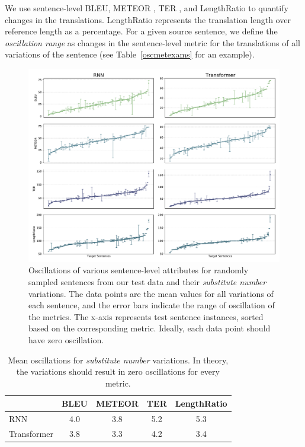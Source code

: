 We use sentence-level BLEU, METEOR \citep{denkowski-lavie-2011-meteor}, TER \citep{Snover06astudy}, and LengthRatio to quantify changes in the translations.
LengthRatio represents the translation length over reference length as a percentage.
For a given source sentence, we define the \textit{oscillation range} as changes in the sentence-level metric for
 the translations of all variations of the sentence (see Table~\ref{oscmetexams} for an example). 


\begin{figure}[htb!]
\centering
\includegraphics[width=1\textwidth]{07-research-05/figs/oscs.pdf}
\caption{Oscillations of various sentence-level attributes for randomly sampled sentences from our test data and their \textit{substitute number} variations. 
The data points are the mean values for all variations of each sentence, and the error bars indicate the range of oscillation of the metrics. The x-axis represents test sentence instances, sorted based on the corresponding metric. 
Ideally, each data point should have zero oscillation. }
\label{figosc}
\end{figure}

\begin{table}[ht]
\center
\small
\caption{\label{oscstats} Mean oscillations for \textit{substitute number} variations. In theory, the variations should result in zero oscillations for every metric.}
\begin{tabularx}{0.63\columnwidth}{lcccc}
\toprule
& \bf BLEU & \bf METEOR & \bf TER & \bf LengthRatio \\
\midrule
RNN & 4.0 & 3.8& 5.2 & 5.3 \\ 
Transformer & 3.8 & 3.3 & 4.2 & 3.4  \\
\bottomrule
\end{tabularx}
\end{table}


